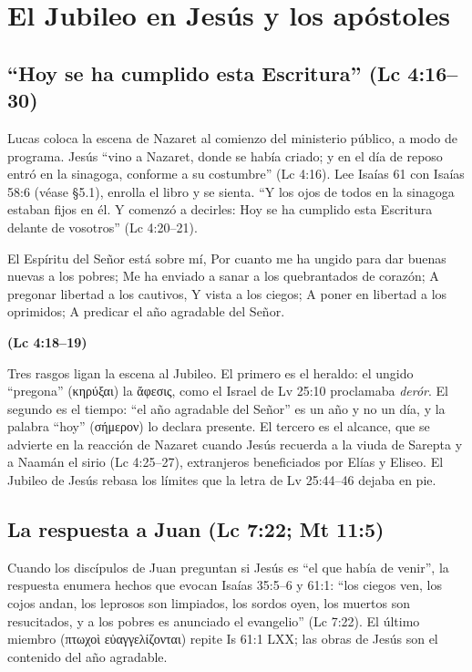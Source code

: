 \documentclass[11pt,letterpaper]{article}
\newcommand{\grc}[1]{\foreignlanguage{ancientgreek}{#1}}
\newcommand{\fuente}[1]{\par\hfill{\upshape\bfseries\small\textcolor{tierraroja}{#1}}}
\begin{document}
\section{El Jubileo en Jesús y los apóstoles}

\subsection{``Hoy se ha cumplido esta Escritura'' (Lc 4:16--30)}
Lucas coloca la escena de Nazaret al comienzo del ministerio público, a modo de programa. Jesús ``vino a Nazaret, donde se había criado; y en el día de reposo entró en la sinagoga, conforme a su costumbre'' (Lc 4:16). Lee Isaías 61 con Isaías 58:6 (véase §5.1), enrolla el libro y se sienta. ``Y los ojos de todos en la sinagoga estaban fijos en él. Y comenzó a decirles: Hoy se ha cumplido esta Escritura delante de vosotros'' (Lc 4:20--21).

\begin{cita}El Espíritu del Señor está sobre mí, Por cuanto me ha ungido para dar buenas nuevas a los pobres; Me ha enviado a sanar a los quebrantados de corazón; A pregonar libertad a los cautivos, Y vista a los ciegos; A poner en libertad a los oprimidos; A predicar el año agradable del Señor.\fuente{(Lc 4:18--19)}\end{cita}

Tres rasgos ligan la escena al Jubileo. El primero es el heraldo: el ungido ``pregona'' (\grc{κηρύξαι}) la \grc{ἄφεσις}, como el Israel de Lv 25:10 proclamaba \emph{derór}. El segundo es el tiempo: ``el año agradable del Señor'' es un año y no un día, y la palabra ``hoy'' (\grc{σήμερον}) lo declara presente. El tercero es el alcance, que se advierte en la reacción de Nazaret cuando Jesús recuerda a la viuda de Sarepta y a Naamán el sirio (Lc 4:25--27), extranjeros beneficiados por Elías y Eliseo. El Jubileo de Jesús rebasa los límites que la letra de Lv 25:44--46 dejaba en pie.

\subsection{La respuesta a Juan (Lc 7:22; Mt 11:5)}
Cuando los discípulos de Juan preguntan si Jesús es ``el que había de venir'', la respuesta enumera hechos que evocan Isaías 35:5--6 y 61:1: ``los ciegos ven, los cojos andan, los leprosos son limpiados, los sordos oyen, los muertos son resucitados, y a los pobres es anunciado el evangelio'' (Lc 7:22). El último miembro (\grc{πτωχοὶ εὐαγγελίζονται}) repite Is 61:1 LXX; las obras de Jesús son el contenido del año agradable.
\end{document}
